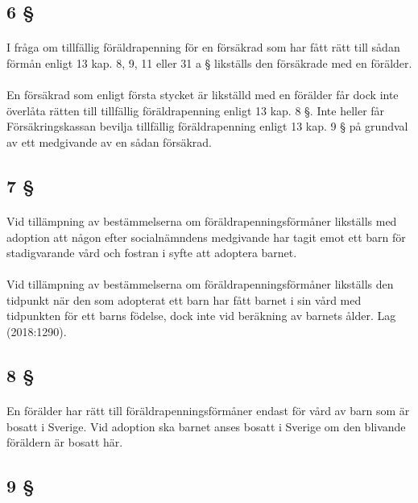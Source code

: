 \documentclass[a4paper,notitlepage,openany,10pt]{book}
\begin{document}
\subsection*{6 §}
\paragraph*{}
I fråga om tillfällig föräldrapenning för en försäkrad som har fått rätt till sådan förmån enligt 13 kap. 8, 9, 11 eller 31 a § likställs den försäkrade med en förälder.
\paragraph*{}
En försäkrad som enligt första stycket är likställd med en förälder får dock inte överlåta rätten till tillfällig föräldrapenning enligt 13 kap. 8 §. Inte heller får Försäkringskassan bevilja tillfällig föräldrapenning enligt 13 kap. 9 § på grundval av ett medgivande av en sådan försäkrad.
\subsection*{7 §}
\paragraph*{}
Vid tillämpning av bestämmelserna om föräldrapenningsförmåner likställs med adoption att någon efter socialnämndens medgivande har tagit emot ett barn för stadigvarande vård och fostran i syfte att adoptera barnet.
\paragraph*{}
Vid tillämpning av bestämmelserna om föräldrapenningsförmåner likställs den tidpunkt när den som adopterat ett barn har fått barnet i sin vård med tidpunkten för ett barns födelse, dock inte vid beräkning av barnets ålder.
Lag (2018:1290).
\subsection*{8 §}
\paragraph*{}
En förälder har rätt till föräldrapenningsförmåner endast för vård av barn som är bosatt i Sverige. Vid adoption ska barnet anses bosatt i Sverige om den blivande föräldern är bosatt här.
\subsection*{9 §}
\end{document}
